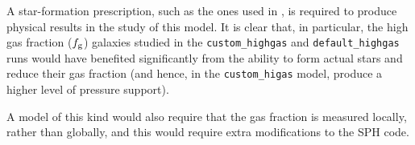 A star-formation prescription, such as the ones used in \citet{many}, is required to produce physical results in the study of this model.
It is clear that, in particular, the high gas fraction ($f_\mathrm{g}$) galaxies studied in the {\tt custom\_highgas} and {\tt default\_highgas} runs would have benefited significantly from the ability to form actual stars and reduce their gas fraction (and hence, in the {\tt custom\_higas} model, produce a higher level of pressure support).

A model of this kind would also require that the gas fraction is measured locally, rather than globally, and this would require extra modifications to the SPH code.
